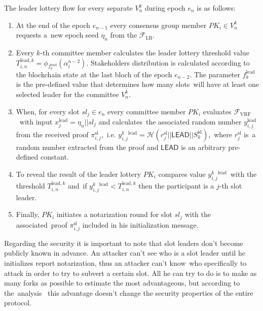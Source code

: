 The leader lottery flow for every separate $V_n^k$ during epoch $e_n$ is as follows:
\begin{enumerate}
    \item At the end of the epoch $e_{n-1}$ every consensus group member $PK_i \in V_n^k$ requests a\
    new epoch seed $\eta_n$ from the ${\mathcal{F}}_{\text{LB}}$.
    \item Every $k$-th committee member calculates the leader lottery threshold value\
    $T_{i, n}^{\text{lead}, k} = \phi_{f^{\text{lead}}_k}(\alpha_{i}^{n - 2})$.
    Stakeholders distribution is calculated according to the blockchain state at the last bloch of the epoch $e_{n - 2}$.
    The parameter $f^{\text{lead}}_k$ is the pre-defined value that determines how many slots\
    will have at least one selected leader for the committee $V_n^k$.
    \item When, for every slot $sl_j \in e_n$ every committee member $PK_i$ evaluates ${\mathcal{F}}_{\text{VRF}}$\
    with input $x_{j}^{\text{lead}} = \eta_n || sl_j $ and calculates\
    the associated random number $y_{i, j}^{\text{lead}}$ from the received proof $\pi_{i, j}^{\text{sl}}$,\
    i.e. ${y^k_{i, j}^{\text{lead}} = \mathcal{H}(r_{j}^{\text{sl}}||\textsf{LEAD}||S_k^{\text{id}})}$,\
    where $r_{j}^{\text{sl}}$ is\
    a random number extracted from the proof and $\textsf{LEAD}$ is an arbitrary pre-defined constant.
    \item To reveal the result of the leader lottery $PK_i$ compares value $y^k_{i, j}^{\text{lead}}$\
    with the threshold $T_{i, n}^{\text{lead}, k}$ and\
    if ${y^k_{i, j}^{\text{lead}} < T_{i, n}^{\text{lead}, k}}$ then the participant is a $j$-th slot leader.\
    \item Finally, $PK_i$ initiates a notarization round for slot $sl_j$ with the associated\
    proof $\pi_{i, j}^{\text{sl}}$ included in his initialization message.
\end{enumerate}

Regarding the security it is important to note that slot leaders don't become publicly known in advance.
An attacker can't see who is a slot leader until he initializes report notarization, thus an attacker can't know\
who specifically to attack in order to try to subvert a certain slot.
All he can try to do is to make as many forks as possible to estimate the most advantageous, but according to the\
analysis~\cite{cryptoeprint:2017/573} this advantage doesn't change the security properties of the entire protocol.

